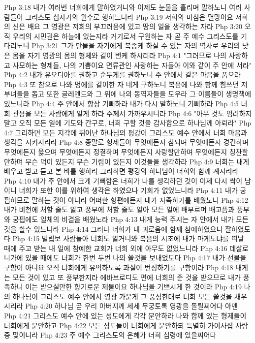 Php 3:18  내가 여러번 너희에게 말하였거니와 이제도 눈물을 흘리며 말하노니 여러 사람들이 그리스도 십자가의 원수로 행하느니라
Php 3:19  저희의 마침은 멸망이요 저희의 신은 배요 그 영광은 저희의 부끄러움에 있고 땅의 일을 생각하는 자라
Php 3:20  오직 우리의 시민권은 하늘에 있는지라 거기로서 구원하는 자 곧 주 예수 그리스도를 기다리노니
Php 3:21  그가 만물을 자기에게 복종케 하실 수 있는 자의 역사로 우리의 낮은 몸을 자기 영광의 몸의 형체와 같이 변케 하시리라
Php 4:1  "그러므로 나의 사랑하고 사모하는 형제들, 나의 기쁨이요 면류관인 사랑하는 자들아 이와 같이 주 안에 서라"
Php 4:2  내가 유오디아를 권하고 순두게를 권하노니 주 안에서 같은 마음을 품으라
Php 4:3  또 참으로 나와 멍에를 같이한 자 네게 구하노니 복음에 나와 함께 힘쓰던 저 부녀들을 돕고 또한 글레멘드와 그 위에 나의 동역자들을 도우라 그 이름들이 생명책에 있느니라
Php 4:4  주 안에서 항상 기뻐하라 내가 다시 말하노니 기뻐하라
Php 4:5  너희 관용을 모든 사람에게 알게 하라 주께서 가까우시니라
Php 4:6  "아무 것도 염려하지 말고 오직 모든 일에 기도와 간구로, 너희 구할 것을 감사함으로 하나님께 아뢰라"
Php 4:7  그리하면 모든 지각에 뛰어난 하나님의 평강이 그리스도 예수 안에서 너희 마음과 생각을 지키시리라
Php 4:8  종말로 형제들아 무엇에든지 참되며 무엇에든지 경건하며 무엇에든지 옳으며 무엇에든지 정결하며 무엇에든지 사랑할만하며 무엇에든지 칭찬할만하며 무슨 덕이 있든지 무슨 기림이 있든지 이것들을 생각하라
Php 4:9  너희는 내게 배우고 받고 듣고 본 바를 행하라 그리하면 평강의 하나님이 너희와 함께 계시리라
Php 4:10  내가 주 안에서 크게 기뻐함은 너희가 나를 생각하던 것이 이제 다시 싹이 남이니 너희가 또한 이를 위하여 생각은 하였으나 기회가 없었느니라
Php 4:11  내가 궁핍하므로 말하는 것이 아니라 어떠한 형편에든지 내가 자족하기를 배웠노니
Php 4:12  내가 비천에 처할 줄도 알고 풍부에 처할 줄도 알아 모든 일에 배부르며 배고픔과 풍부와 궁핍에도 일체의 비결을 배웠노라
Php 4:13  내게 능력 주시는 자 안에서 내가 모든 것을 할수 있느니라
Php 4:14  그러나 너희가 내 괴로움에 함께 참예하였으니 잘하였도다
Php 4:15  빌립보 사람들아 너희도 알거니와 복음의 시초에 내가 마게도냐를 떠날 때에 주고 받는 내 일에 참예한 교회가 너희 외에 아무도 없었느니라
Php 4:16  데살로니가에 있을 때에도 너희가 한번 두번 나의 쓸것을 보내었도다
Php 4:17  내가 선물을 구함이 아니요 오직 너희에게 유익하도록 과실이 번성하기를 구함이라
Php 4:18  내게는 모든 것이 있고 또 풍부한지라 에바브로디도 편에 너희의 준 것을 받으므로 내가 풍족하니 이는 받으실만한 향기로운 제물이요 하나님을 기쁘시게 한 것이라
Php 4:19  나의 하나님이 그리스도 예수 안에서 영광 가운게 그 풍성한대로 너희 모든 쓸것을 채우시리라
Php 4:20  하나님 곧 우리 아버지께 세세 무궁토록 영광을 돌릴찌어다 아멘
Php 4:21  그리스도 예수 안에 있는 성도에게 각각 문안하라 나와 함께 있는 형제들이 너희에게 문안하고
Php 4:22  모든 성도들이 너희에게 문안하되 특별히 가이사집 사람 중 몇이니라
Php 4:23  주 예수 그리스도의 은혜가 너희 심령에 있을찌어다


